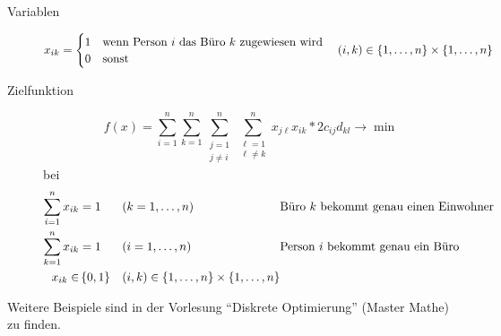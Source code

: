 \begin{description}
	\item[Variablen] $x_{ik} = \begin{cases}
	1 & \text{wenn Person $i$ das Büro $k$ zugewiesen wird} \\ 0 & \text{sonst}
	\end{cases} \quad (i,k) \in \left\{ 1, \dots , n \right\} \times \left\{ 1, \dots , n \right\}$
	
	\item[Zielfunktion]
	\begin{equation*}
		f(x) = \sum_{i=1}^n \sum_{k=1}^n \sum\limits_{\substack{j=1 \\ j \neq i}}^n \sum\limits_{\substack{\ell =1 \\ \ell \neq k}}^n x_{j \ell} x_{i k} * 2c_{ij} d_{kl} \to \min
	\end{equation*}
	bei
	\begin{equation*}
		\begin{alignedat}{3}
		\sum_{i=1}^n x_{ik} &= 1 \quad &&(k = 1, \dots, n) \quad &&\text{Büro $k$ bekommt genau einen Einwohner} \\
		\sum_{k=1}^n x_{ik} &= 1 &&(i = 1, \dots, n) &&\text{Person $i$ bekommt genau ein Büro} \\
		x_{ik} \in &\left\{ 0,1 \right\} \quad &&(i,k) \in \left\{ 1, \dots , n \right\} \times \left\{ 1, \dots , n \right\} &&
		\end{alignedat}
	\end{equation*}
\end{description}


Weitere Beispiele sind in der Vorlesung \enquote{Diskrete Optimierung} (Master Mathe) zu finden.
